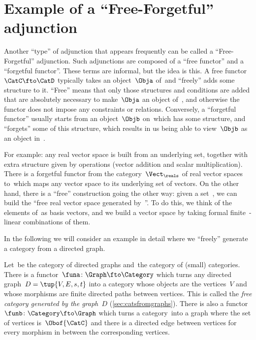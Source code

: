 
\section[Free-forgetful adjunction]{Example of a ``Free-Forgetful'' adjunction}
\label{sec:free-forgetful-adjunction-graph-example}

Another ``type'' of adjunction that appears frequently can be called a ``Free-Forgetful'' adjunction.
Such adjunctions are composed of a ``free functor'' and a ``forgetful functor''.
These terms are informal, but the idea is this.
A free functor~$\CatC \fto \CatD$ typically takes an object~$\Obja$ of~\CatC and ``freely'' adds some structure to it.
``Free'' means that only those structures and conditions are added that are absolutely necessary to make~$\Obja$ an object of~\CatD, and otherwise the functor does not impose any constraints or relations.
Conversely, a ``forgetful functor'' usually starts from an object~$\Objb$ on~\CatD which has some structure, and ``forgets'' some of this structure, which results in us being able to view~$\Objb$ as an object in~\CatC.

For example: any real vector space is built from an underlying set, together with extra structure given by operations (vector addition and scalar multiplication).
There is a forgetful functor from the category~$\Vect_{\reals}$ of real vector spaces to~\Set which maps any vector space to its underlying set of vectors.
On the other hand, there is a ``free'' construction going the other way: given a set~\setA, we can build the ``free real vector space generated by~\setA''.
To do this, we think of the elements of~\setA as basis vectors, and we build a vector space by taking formal finite~\reals-linear combinations of them.

In the following we will consider an example in detail where we ``freely'' generate a category from a directed graph.

Let~\Graph be the category of directed graphs and~\Category the category of (small) categories.
There is a functor~$\funa \colon \Graph \fto \Category$ which turns any directed graph~$D = \tup{V,E, s,t}$ into a category whose objects are the vertices~$V$ and whose morphisms are finite directed paths between vertices.
This is called the \emph{free category generated by the graph~$D$} (\cref{sec:catsfromgraphs}).
There is also a functor~$\funb \colon \Category \fto \Graph$ which turns a category~\CatC into a graph where the set of vertices is~$\Obof{\CatC}$ and there is a directed edge between vertices for every morphism in \CatC between the corresponding vertices.

